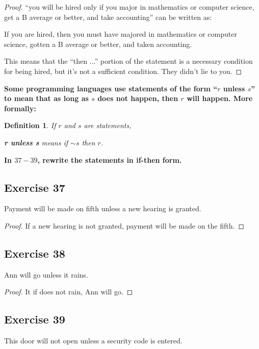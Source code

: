 \documentclass[14pt]{extarticle}
\newtheorem{defn}{Definition}
\begin{document}
\begin{proof}
    ``you will be hired only if you major in mathematics or computer
    science, get a B average or better, and take accounting'' can be written as:

    If you are hired, then you must have majored in mathematics or computer science, gotten a B average or better, and taken accounting.

    This means that the ``then ...'' portion of the statement is a necessary condition for being hired, but it's not a sufficient condition. They didn't lie to you.
\end{proof}

{\bf Some programming languages use statements of the form “$r$ unless $s$” to mean that as long as $s$ does not happen, then $r$ will happen. More formally:}

\begin{tcolorbox}[colframe=cyan,colback=white]
    \begin{defn}
        If $r$ and $s$ are statements,
        \begin{center}
            {\bf r unless s} means if ${\sim s}$ then $r$.
        \end{center}
    \end{defn}
\end{tcolorbox}

{\bf In $37-39$, rewrite the statements in if-then form.}

\subsection{Exercise 37} Payment will be made on fifth unless a new hearing is granted.

\begin{proof}
    If a new hearing is not granted, payment will be made on the fifth.
\end{proof}

\subsection{Exercise 38}
Ann will go unless it rains.

\begin{proof}
    It if does not rain, Ann will go.
\end{proof}

\subsection{Exercise 39}
This door will not open unless a security code is entered.
\end{document}
